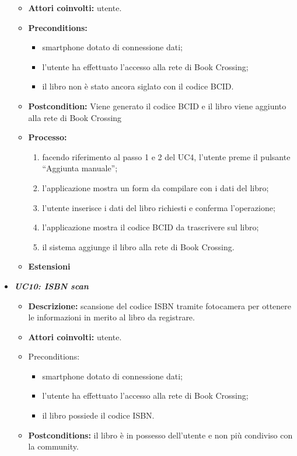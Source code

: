 \begin{itemize}
\begin{itemize}
		\item \textbf{Attori coinvolti:} utente.
		\item \textbf{Preconditions:}
		\begin{itemize}
			\item smartphone dotato di connessione dati;
			\item l’utente ha effettuato l’accesso alla rete di Book Crossing;
			\item il libro non è stato ancora siglato con il codice BCID.
		\end{itemize}
		\item \textbf{Postcondition:} Viene generato il codice BCID e il libro viene aggiunto alla rete di Book Crossing
		\item \textbf{Processo: }
		\begin{enumerate}
			\item facendo riferimento al passo 1 e 2 del UC4, l'utente preme il pulsante “Aggiunta manuale”;
			\item l’applicazione mostra un form da compilare con i dati del libro;
			\item l’utente inserisce i dati del libro richiesti e conferma l’operazione;
			\item l’applicazione mostra il codice BCID da trascrivere sul libro;
			\item il sistema aggiunge il libro alla rete di Book Crossing.
		\end{enumerate}
		\item \textbf{Estensioni}
	\end{itemize}
	\item \textbf{\textit{UC10: ISBN scan}}
	\begin{itemize}
		\item \textbf{Descrizione:} scansione del codice ISBN tramite fotocamera per ottenere le informazioni in merito al libro da registrare.
		\item \textbf{Attori coinvolti:} utente.
		\item {Preconditions:} 
		\begin{itemize}
			\item smartphone dotato di connessione dati;
			\item l’utente ha effettuato l’accesso alla rete di Book Crossing;
			\item il libro possiede il codice ISBN.
		\end{itemize}
		\item \textbf{Postconditions:} il libro è in possesso dell'utente e non più condiviso con la community.

\end{itemize}
\end{itemize}
